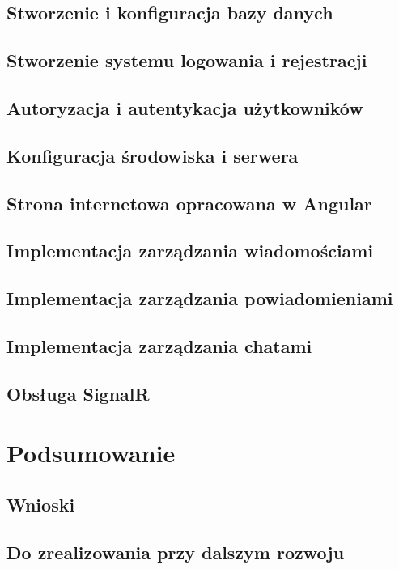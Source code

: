 \documentclass[12pt,a4paper]{article}
\begin{document}
\subsection{Stworzenie i konfiguracja bazy danych}
\subsection{Stworzenie systemu logowania i rejestracji}
\subsection{Autoryzacja i autentykacja użytkowników}
\subsection{Konfiguracja środowiska i serwera}

\subsection{Strona internetowa opracowana w Angular}
\subsection{Implementacja zarządzania wiadomościami}
\subsection{Implementacja zarządzania powiadomieniami}
\subsection{Implementacja zarządzania chatami}
\subsection{Obsługa SignalR}

\section{Podsumowanie}

\subsection{Wnioski}
\subsection{Do zrealizowania przy dalszym rozwoju}
\end{document}
